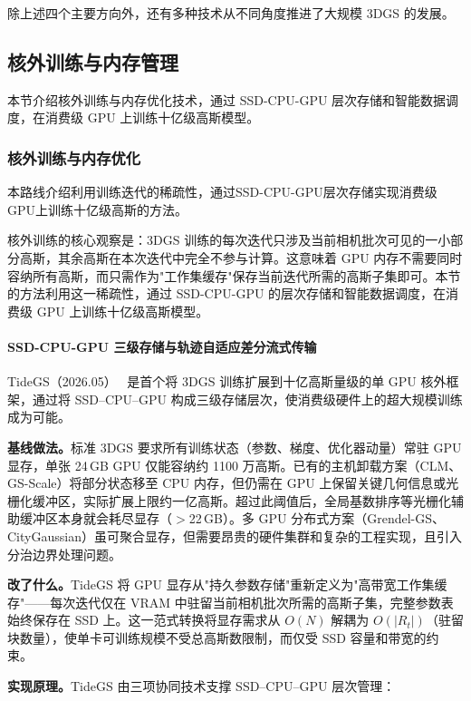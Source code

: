 除上述四个主要方向外，还有多种技术从不同角度推进了大规模 3DGS 的发展。

\subsection{核外训练与内存管理}
\label{ss:14_9}

本节介绍核外训练与内存优化技术，通过 SSD-CPU-GPU 层次存储和智能数据调度，在消费级 GPU 上训练十亿级高斯模型。

\subsubsection{核外训练与内存优化}

本路线介绍利用训练迭代的稀疏性，通过SSD-CPU-GPU层次存储实现消费级GPU上训练十亿级高斯的方法。

核外训练的核心观察是：3DGS 训练的每次迭代只涉及当前相机批次可见的一小部分高斯，其余高斯在本次迭代中完全不参与计算。这意味着 GPU 内存不需要同时容纳所有高斯，而只需作为"工作集缓存"保存当前迭代所需的高斯子集即可。本节的方法利用这一稀疏性，通过 SSD-CPU-GPU 的层次存储和智能数据调度，在消费级 GPU 上训练十亿级高斯模型。

\paragraph{SSD-CPU-GPU 三级存储与轨迹自适应差分流式传输}

TideGS（2026.05）~\cite{2605_20150} 是首个将 3DGS 训练扩展到十亿高斯量级的单 GPU 核外框架，通过将 SSD--CPU--GPU 构成三级存储层次，使消费级硬件上的超大规模训练成为可能。

\textbf{基线做法。}标准 3DGS 要求所有训练状态（参数、梯度、优化器动量）常驻 GPU 显存，单张 24\,GB GPU 仅能容纳约 1100 万高斯。已有的主机卸载方案（CLM、GS-Scale）将部分状态移至 CPU 内存，但仍需在 GPU 上保留关键几何信息或光栅化缓冲区，实际扩展上限约一亿高斯。超过此阈值后，全局基数排序等光栅化辅助缓冲区本身就会耗尽显存（$>$22\,GB）。多 GPU 分布式方案（Grendel-GS、CityGaussian）虽可聚合显存，但需要昂贵的硬件集群和复杂的工程实现，且引入分治边界处理问题。

\textbf{改了什么。}TideGS 将 GPU 显存从"持久参数存储"重新定义为"高带宽工作集缓存"——每次迭代仅在 VRAM 中驻留当前相机批次所需的高斯子集，完整参数表始终保存在 SSD 上。这一范式转换将显存需求从 $O(N)$ 解耦为 $O(|R_t|)$（驻留块数量），使单卡可训练规模不受总高斯数限制，而仅受 SSD 容量和带宽的约束。

\textbf{实现原理。}TideGS 由三项协同技术支撑 SSD--CPU--GPU 层次管理：

